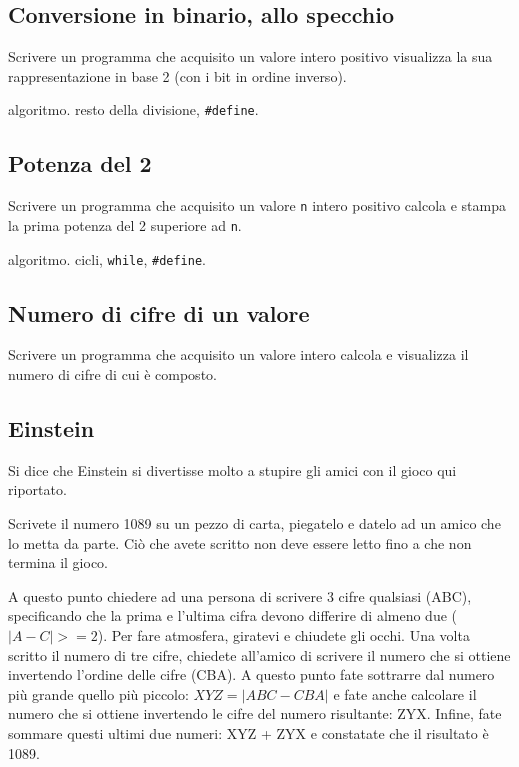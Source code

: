 \subsection{Conversione in binario, allo specchio}
Scrivere un programma che acquisito un valore intero positivo visualizza la sua rappresentazione in base 2 (con i bit in ordine inverso).

\begin{tags}
algoritmo. resto della divisione, \texttt{\#define}.
\end{tags}


\subsection{Potenza del 2}
Scrivere un programma che acquisito un valore \texttt{n} intero positivo calcola e stampa la prima potenza del 2 superiore ad \texttt{n}.

\begin{tags}
algoritmo. cicli, \texttt{while}, \texttt{\#define}.
\end{tags}


\subsection{Numero di cifre di un valore}
Scrivere un programma che acquisito un valore intero calcola e visualizza il numero di cifre di cui \`e composto.


\subsection{Einstein}
Si dice che Einstein si divertisse molto a stupire gli amici con il gioco qui riportato.

Scrivete il numero 1089 su un pezzo di carta, piegatelo e datelo ad un amico che lo metta da parte. Ci\`o che avete scritto non deve essere letto fino a che non termina il gioco.

A questo punto chiedere ad una persona di scrivere 3 cifre qualsiasi (ABC), specificando che la prima e l'ultima cifra devono differire di almeno due ($|A-C| >=2$). Per fare atmosfera, giratevi e chiudete gli occhi. Una volta scritto il numero di tre cifre, chiedete all'amico di scrivere il numero che si ottiene invertendo l'ordine delle cifre (CBA). A questo punto fate sottrarre dal numero pi\`u grande quello pi\`u piccolo: $XYZ = |ABC - CBA|$ e fate anche calcolare il numero che si ottiene invertendo le cifre del numero risultante: ZYX. Infine, fate sommare questi ultimi due numeri: XYZ + ZYX e constatate che il risultato \`e 1089.

